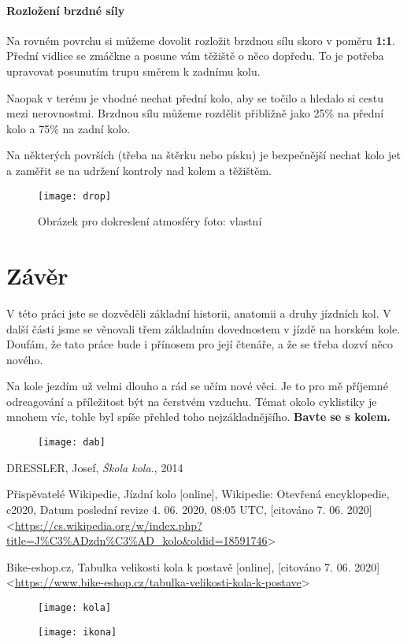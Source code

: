 \documentclass[11pt]{article}
\begin{document}
\paragraph*{Rozložení brzdné síly}
Na rovném povrchu si můžeme dovolit rozložit brzdnou sílu skoro v poměru \textbf{1:1}. Přední vidlice se zmáčkne a posune vám těžiště o něco dopředu. To je potřeba upravovat posunutím trupu směrem k zadnímu kolu. 

Naopak v terénu je vhodné nechat přední kolo, aby se točilo a hledalo si cestu mezi nerovnostmi. Brzdnou sílu můžeme rozdělit přibližně jako 25\% na přední kolo a 75\% na zadní kolo. \newline

\noindent Na některých površích (třeba na štěrku nebo písku) je bezpečnější nechat kolo jet a zaměřit se na udržení kontroly nad kolem a těžištěm. 

\begin{figure}[h]
    \centering
    \texttt{[image: drop]}
    \caption{Obrázek pro dokreslení atmosféry \tiny{foto: vlastní}}
    \label{fig:drop}
\end{figure}
\newpage

\section{Závěr}
V této práci jste se dozvěděli základní historii, anatomii a druhy jízdních kol. V další části jsme se věnovali třem základním dovednostem v jízdě na horském kole. Doufám, že tato práce bude i přínosem pro její čtenáře, a že se třeba dozví něco nového. 

Na kole jezdím už velmi dlouho a rád se učím nové věci. Je to pro mě příjemné odreagování a příležitost být na čerstvém vzduchu. Témat okolo cyklistiky je mnohem víc, tohle byl spíše přehled toho nejzákladnějšího. 
\newline\noindent\newline\large{\textbf{Bavte se s kolem.}}
\vspace*{2cm}
\begin{figure}[h]
    \centering
    \texttt{[image: dab]}
\end{figure}
\newpage

\begin{thebibliography}{10}
DRESSLER, Josef, \textit{Škola kola.}, 2014

Přispěvatelé Wikipedie, Jízdní kolo [online], Wikipedie: Otevřená encyklopedie, c2020, Datum poslední revize 4. 06. 2020, 08:05 UTC, [citováno 7. 06. 2020] \newline <\url{https://cs.wikipedia.org/w/index.php?title=J%C3%ADzdn%C3%AD_kolo&oldid=18591746}>

Bike-eshop.cz, Tabulka velikosti kola k postavě [online], [citováno 7. 06. 2020]\newline <\url{https://www.bike-eshop.cz/tabulka-velikosti-kola-k-postave}>
\end{thebibliography}
\vspace*{2cm}
\begin{figure}[h]
    \centering
    \texttt{[image: kola]}
\end{figure}

\newpage
{}
\vspace*{\fill}
\begin{figure}[h]
    \centering
    \texttt{[image: ikona]}
\end{figure}
\end{document}
